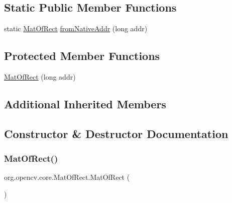 \subsection*{Static Public Member Functions}
\begin{DoxyCompactItemize}
\item 
static \mbox{\hyperlink{classorg_1_1opencv_1_1core_1_1_mat_of_rect}{Mat\+Of\+Rect}} \mbox{\hyperlink{classorg_1_1opencv_1_1core_1_1_mat_of_rect_a6a7dd2ac3097599245b81d6271d42ecd}{from\+Native\+Addr}} (long addr)
\end{DoxyCompactItemize}
\subsection*{Protected Member Functions}
\begin{DoxyCompactItemize}
\item 
\mbox{\hyperlink{classorg_1_1opencv_1_1core_1_1_mat_of_rect_aefd91fbed8b667e5801195f5acb3fb40}{Mat\+Of\+Rect}} (long addr)
\end{DoxyCompactItemize}
\subsection*{Additional Inherited Members}


\subsection{Constructor \& Destructor Documentation}
\mbox{\label{classorg_1_1opencv_1_1core_1_1_mat_of_rect_aed75ce193773aa5db797a83e6a714a97}} 
\subsubsection{\texorpdfstring{Mat\+Of\+Rect()}{MatOfRect()}\hspace{0.1cm}{\footnotesize\ttfamily [1/4]}}
{\footnotesize\ttfamily org.\+opencv.\+core.\+Mat\+Of\+Rect.\+Mat\+Of\+Rect (\begin{DoxyParamCaption}{ }\end{DoxyParamCaption})}

\mbox{\label{classorg_1_1opencv_1_1core_1_1_mat_of_rect_aefd91fbed8b667e5801195f5acb3fb40}} 
